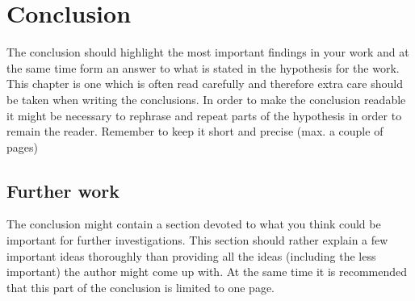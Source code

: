 \chapter{Conclusion}
The conclusion should highlight the most important findings in your work and at the same time form an answer to what is stated in the hypothesis for the work. This chapter is one which is often read carefully and therefore extra care should be taken when writing the conclusions. In order to make the conclusion readable it might be necessary to rephrase and repeat parts of the hypothesis in order to remain the reader. Remember to keep it short and precise (max. a couple of pages)
 
\section{Further work}
The conclusion might contain a section devoted to what you think could be important for further investigations. This section should rather explain a few important ideas thoroughly than providing all the ideas (including the less important) the author might come up with. At the same time it is recommended that this part of the conclusion is limited to one page. 